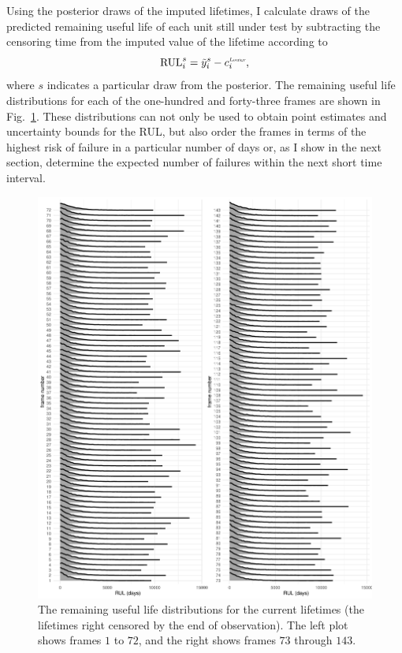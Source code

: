 Using the posterior draws of the imputed lifetimes, I calculate draws of the predicted remaining useful life of each unit still under test by subtracting the censoring time from the imputed value of the lifetime according to
\begin{equation} \label{eq:idler-rul}
  \hbox{RUL}^s_i  = \tilde{y}_{i}^s - c^{\textit{\tiny{Lower}}}_i,
\end{equation}
where $s$ indicates a particular draw from the posterior. The remaining useful life distributions for each of the one-hundred and forty-three frames are shown in Fig.~\ref{fig:idler-FTs}. These distributions can not only be used to obtain point estimates and uncertainty bounds for the RUL, but also order the frames in terms of the highest risk of failure in a particular number of days or, as I show in the next section, determine the expected number of failures within the next short time interval.

\begin{figure}
  \centering
  \includegraphics[width=1\textwidth]{./figures/ch-3/posterior-FTs.pdf}
  \caption{The remaining useful life distributions for the current lifetimes (the lifetimes right censored by the end of observation). The left plot shows frames $1$ to $72$, and the right shows frames $73$ through $143$.}
  \label{fig:idler-FTs}
\end{figure}

